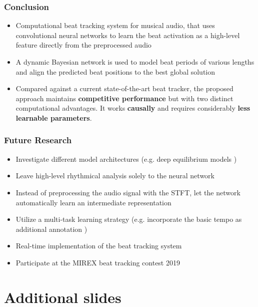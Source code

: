 \documentclass{beamer}
\begin{document}
\begin{frame}
\frametitle{Conclusion}
\begin{itemize}
\item Computational beat tracking system for musical audio, that uses convolutional neural networks to learn the beat activation as a high-level feature directly from the preprocessed audio
\item A dynamic Bayesian network is used to model beat periods of various lengths and align the predicted beat positions to the best global solution
\item Compared against a current state-of-the-art beat tracker, the proposed approach maintains \textbf{competitive performance} but with two distinct computational advantages. It works \textbf{causally} and requires considerably \textbf{less learnable parameters}. 
\end{itemize}
\end{frame}



\begin{frame}
\frametitle{Future Research}
\begin{itemize}
\item Investigate different model architectures (e.g. deep equilibrium models \cite{Bai2019b})
\item Leave high-level rhythmical analysis solely to the neural network 
\item Instead of preprocessing the audio signal with the STFT, let the network automatically learn an intermediate representation
\item Utilize a multi-task learning strategy (e.g. incorporate the basic tempo as additional annotation \cite{Boeck2019})
\item Real-time implementation of the beat tracking system
\item Participate at the MIREX beat tracking contest 2019
\end{itemize}
\end{frame}










\section*{Additional slides}
\end{document}
